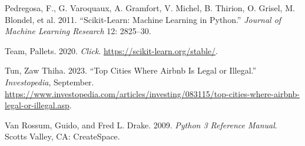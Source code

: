 \documentclass[
  letterpaper,
  DIV=11,
  numbers=noendperiod]{scrartcl}
\newlength{\cslhangindent}
\newenvironment{CSLReferences}[2] %
 {\begin{list}{}{%
  \setlength{\itemindent}{0pt}
  \setlength{\leftmargin}{0pt}
  \setlength{\parsep}{0pt}
  \ifodd #1
   \setlength{\leftmargin}{\cslhangindent}
   \setlength{\itemindent}{-1\cslhangindent}
  \fi
  \setlength{\itemsep}{#2\baselineskip}}}
 {\end{list}}
\begin{document}
\begin{CSLReferences}{1}{0}
Pedregosa, F., G. Varoquaux, A. Gramfort, V. Michel, B. Thirion, O.
Grisel, M. Blondel, et al. 2011. {``Scikit-Learn: Machine Learning in
{P}ython.''} \emph{Journal of Machine Learning Research} 12: 2825--30.

Team, Pallets. 2020. \emph{Click}.
\url{https://scikit-learn.org/stable/}.

Tun, Zaw Thiha. 2023. {``Top Cities Where Airbnb Is Legal or Illegal.''}
\emph{Investopedia}, September.
\url{https://www.investopedia.com/articles/investing/083115/top-cities-where-airbnb-legal-or-illegal.asp}.

Van Rossum, Guido, and Fred L. Drake. 2009. \emph{Python 3 Reference
Manual}. Scotts Valley, CA: CreateSpace.

\end{CSLReferences}
\end{document}

